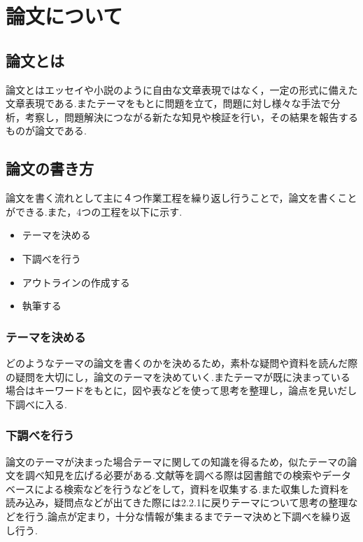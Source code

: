 \documentclass[a4j,12pt]{jarticle}
\begin{document}
\section{論文について}
\subsection{論文とは}
論文とはエッセイや小説のように自由な文章表現ではなく，一定の形式に備えた文章表現である.またテーマをもとに問題を立て，問題に対し様々な手法で分析，考察し，問題解決につながる新たな知見や検証を行い，その結果を報告するものが論文である\cite{ren1}.

\subsection{論文の書き方}
論文を書く流れとして主に４つ作業工程を繰り返し行うことで，論文を書くことができる.また，4つの工程を以下に示す.
\begin{itemize}
  \item テーマを決める
  \item 下調べを行う
  \item アウトラインの作成する
  \item 執筆する
\end{itemize}
\subsubsection{テーマを決める}
どのようなテーマの論文を書くのかを決めるため，素朴な疑問や資料を読んだ際の疑問を大切にし，論文のテーマを決めていく.またテーマが既に決まっている場合はキーワードをもとに，図や表などを使って思考を整理し，論点を見いだし下調べに入る.
\newpage
\subsubsection{下調べを行う}
論文のテーマが決まった場合テーマに関しての知識を得るため，似たテーマの論文を調べ知見を広げる必要がある.文献等を調べる際は図書館での検索やデータベースによる検索などを行うなどをして，資料を収集する.また収集した資料を読み込み，疑問点などが出てきた際には2.2.1に戻りテーマについて思考の整理などを行う.論点が定まり，十分な情報が集まるまでテーマ決めと下調べを繰り返し行う.
\newpage
\end{document}
